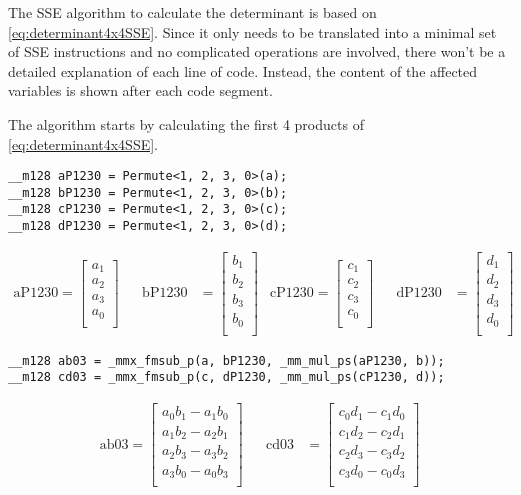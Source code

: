 The SSE algorithm to calculate the determinant is based on \cref{eq:determinant4x4SSE}.
Since it only needs to be translated into a minimal set of SSE instructions and no complicated operations are involved, there won't be a detailed explanation of each line of code.
Instead, the content of the affected variables is shown after each code segment.

The algorithm starts by calculating the first 4 products of \cref{eq:determinant4x4SSE}.


\begin{verbatim}
__m128 aP1230 = Permute<1, 2, 3, 0>(a);
__m128 bP1230 = Permute<1, 2, 3, 0>(b);
__m128 cP1230 = Permute<1, 2, 3, 0>(c);
__m128 dP1230 = Permute<1, 2, 3, 0>(d);
\end{verbatim}

\begin{align*}
\mathrm{aP1230} 
=
\begin{bmatrix}
a_1\\
a_2\\
a_3\\
a_0\\
\end{bmatrix}
&&
\mathrm{bP1230} 
&=
\begin{bmatrix}
b_1\\
b_2\\
b_3\\
b_0\\
\end{bmatrix}
&
\mathrm{cP1230} 
=
\begin{bmatrix}
c_1\\
c_2\\
c_3\\
c_0\\
\end{bmatrix}
&&
\mathrm{dP1230} 
&=
\begin{bmatrix}
d_1\\
d_2\\
d_3\\
d_0\\
\end{bmatrix}
\end{align*}

\begin{verbatim}
__m128 ab03 = _mmx_fmsub_p(a, bP1230, _mm_mul_ps(aP1230, b));
__m128 cd03 = _mmx_fmsub_p(c, dP1230, _mm_mul_ps(cP1230, d));
\end{verbatim}


\begin{align*}
\mathrm{ab03} 
=
\begin{bmatrix}
a_0b_1 - a_1b_0\\
a_1b_2 - a_2b_1\\
a_2b_3 - a_3b_2\\
a_3b_0 - a_0b_3\\
\end{bmatrix}
&&
\mathrm{cd03} 
&=
\begin{bmatrix}
c_0d_1 - c_1d_0\\
c_1d_2 - c_2d_1\\
c_2d_3 - c_3d_2\\
c_3d_0 - c_0d_3\\
\end{bmatrix}
\end{align*}

